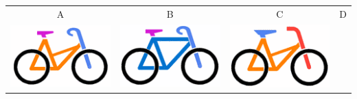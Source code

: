 \documentclass[12pt]{article}
\begin{document}
\begin{minipage}{\textwidth}
			\begin{table}[H]
				\begin{tabulary}{\linewidth}{|C|C|C|C|}
					\hline
					A & B & C & D \\
					\includegraphics[width=\linewidth]{option1} &
					\includegraphics[width=\linewidth]{option2} &
					\includegraphics[width=\linewidth]{option3} &

\end{tabulary}
\end{table}
\end{minipage}
\end{document}
